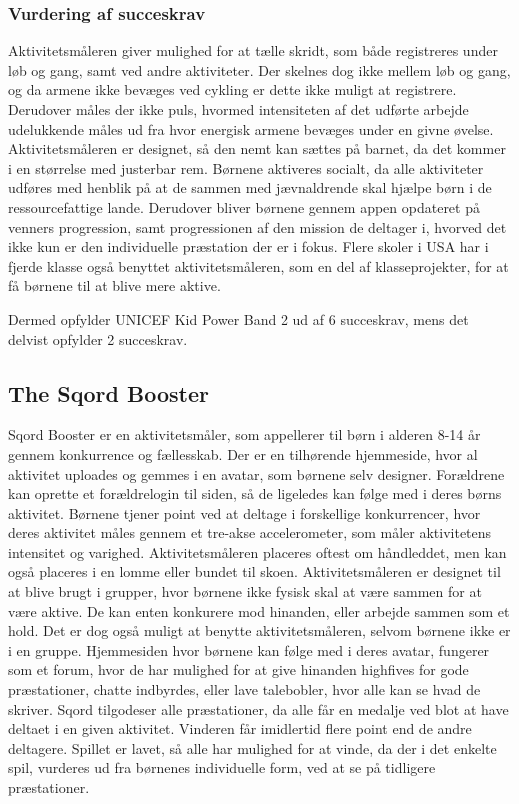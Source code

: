 \subsubsection{Vurdering af succeskrav}
Aktivitetsmåleren giver mulighed for at tælle skridt, som både registreres under løb og gang, samt ved andre aktiviteter. Der skelnes dog ikke mellem løb og gang, og da armene ikke bevæges ved cykling er dette ikke muligt at registrere. Derudover måles der ikke puls, hvormed intensiteten af det udførte arbejde udelukkende måles ud fra hvor energisk armene bevæges under en givne øvelse. Aktivitetsmåleren er designet, så den nemt kan sættes på barnet, da det kommer i en størrelse med justerbar rem.\citep{PowerManual2015} \newline
Børnene aktiveres socialt, da alle aktiviteter udføres med henblik på at de sammen med jævnaldrende skal hjælpe børn i de ressourcefattige lande. Derudover bliver børnene gennem appen opdateret på venners progression, samt progressionen af den mission de deltager i, hvorved det ikke kun er den individuelle præstation der er i fokus. Flere skoler i USA har i fjerde klasse også benyttet aktivitetsmåleren, som en del af klasseprojekter, for at få børnene til at blive mere aktive.\citep{PowerAbout2015}

Dermed opfylder UNICEF Kid Power Band 2 ud af 6 succeskrav, mens det delvist opfylder 2 succeskrav.

\subsection{The Sqord Booster}
Sqord Booster er en aktivitetsmåler, som appellerer til børn i alderen 8-14 år gennem konkurrence og fællesskab. Der er en tilhørende hjemmeside, hvor al aktivitet uploades og gemmes i en avatar, som børnene selv designer. Forældrene kan oprette et forældrelogin til siden, så de ligeledes kan følge med i deres børns aktivitet. Børnene tjener point ved at deltage i forskellige konkurrencer, hvor deres aktivitet måles gennem et tre-akse accelerometer, som måler aktivitetens intensitet og varighed. Aktivitetsmåleren placeres oftest om håndleddet, men kan også placeres i en lomme eller bundet til skoen. \newline
Aktivitetsmåleren er designet til at blive brugt i grupper, hvor børnene ikke fysisk skal at være sammen for at være aktive. De kan enten konkurere mod hinanden, eller arbejde sammen som et hold. Det er dog også muligt at benytte aktivitetsmåleren, selvom børnene ikke er i en gruppe. \newline
Hjemmesiden hvor børnene kan følge med i deres avatar, fungerer som et forum, hvor de har mulighed for at give hinanden highfives for gode præstationer, chatte indbyrdes, eller lave talebobler, hvor alle kan se hvad de skriver. \newline
Sqord tilgodeser alle præstationer, da alle får en medalje ved blot at have deltaet i en given aktivitet. Vinderen får imidlertid flere point end de andre deltagere. Spillet er lavet, så alle har mulighed for at vinde, da der i det enkelte spil, vurderes ud fra børnenes individuelle form, ved at se på tidligere præstationer.

